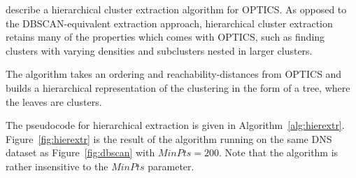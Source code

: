 \documentclass[a4paper]{report}
\begin{document}
\citet{sander03} describe a hierarchical cluster extraction algorithm for
OPTICS. As opposed to the DBSCAN-equivalent extraction approach, hierarchical
cluster extraction retains many of the properties which comes with OPTICS,
such as finding clusters with varying densities and subclusters nested in larger
clusters.

The algorithm takes an ordering and reachability-distances from OPTICS and
builds a hierarchical representation of the clustering in the form of a tree,
where the leaves are clusters.

The pseudocode for hierarchical extraction is given in
Algorithm~\ref{alg:hierextr}. Figure~\ref{fig:hierextr} is the result of
the algorithm running on the same DNS dataset as Figure~\ref{fig:dbscan}
with $MinPts = 200$. Note that the algorithm is rather insensitive to the
$MinPts$ parameter.
\\
\end{document}
